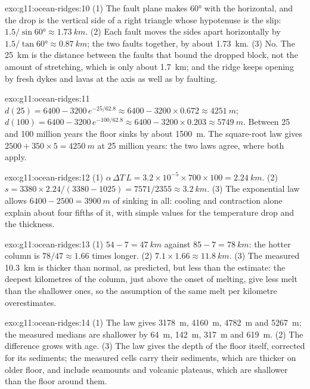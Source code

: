 \begin{solution}{exo:g11:ocean-ridges:10}
(1) The fault plane makes \ang{60} with the horizontal, and the drop is the
vertical side of a right triangle whose hypotenuse is the slip:
$1.5/\sin\ang{60} \approx \qty{1.73}{km}$. (2) Each fault moves the sides
apart horizontally by $1.5/\tan\ang{60} \approx \qty{0.87}{km}$; the two
faults together, by about \qty{1.73}{km}. (3) No. The \qty{25}{km} is the
distance between the faults that bound the dropped block, not the amount of
stretching, which is only about \qty{1.7}{km}; and the ridge keeps opening
by fresh dykes and lavas at the axis as well as by faulting.
\end{solution}

\begin{solution}{exo:g11:ocean-ridges:11}
$d(25) = 6400 - 3200\,e^{-25/62.8} \approx 6400 - 3200 \times 0.672 \approx
\qty{4251}{m}$; $d(100) = 6400 - 3200\,e^{-100/62.8} \approx 6400 - 3200
\times 0.203 \approx \qty{5749}{m}$. Between 25 and 100 million years the
floor sinks by about \qty{1500}{m}. The square-root law gives
$2500 + 350 \times 5 = \qty{4250}{m}$ at 25 million years: the two laws
agree, where both apply.
\end{solution}

\begin{solution}{exo:g11:ocean-ridges:12}
(1) $\alpha\,\Delta T\,L = 3.2 \times 10^{-5} \times 700 \times 100 =
\qty{2.24}{km}$. (2) $s = 3380 \times 2.24/(3380 - 1025) = 7571/2355 \approx
\qty{3.2}{km}$. (3) The exponential law allows $6400 - 2500 =
\qty{3900}{m}$ of sinking in all: cooling and contraction alone explain about
four fifths of it, with simple values for the temperature drop and the
thickness.
\end{solution}

\begin{solution}{exo:g11:ocean-ridges:13}
(1) $54 - 7 = \qty{47}{km}$ against $85 - 7 = \qty{78}{km}$: the hotter
column is $78/47 \approx 1.66$ times longer. (2) $7.1 \times 1.66 \approx
\qty{11.8}{km}$. (3) The measured \qty{10.3}{km} is thicker than normal, as
predicted, but less than the estimate: the deepest kilometres of the column,
just above the onset of melting, give less melt than the shallower ones, so
the assumption of the same melt per kilometre overestimates.
\end{solution}

\begin{solution}{exo:g11:ocean-ridges:14}
(1) The law gives \qty{3178}{m}, \qty{4160}{m}, \qty{4782}{m} and
\qty{5267}{m}; the measured medians are shallower by \qty{64}{m},
\qty{142}{m}, \qty{317}{m} and \qty{619}{m}. (2) The difference grows with
age. (3) The law gives the depth of the floor itself, corrected for its
sediments; the measured cells carry their sediments, which are thicker on
older floor, and include seamounts and volcanic plateaus, which are
shallower than the floor around them.
\end{solution}

